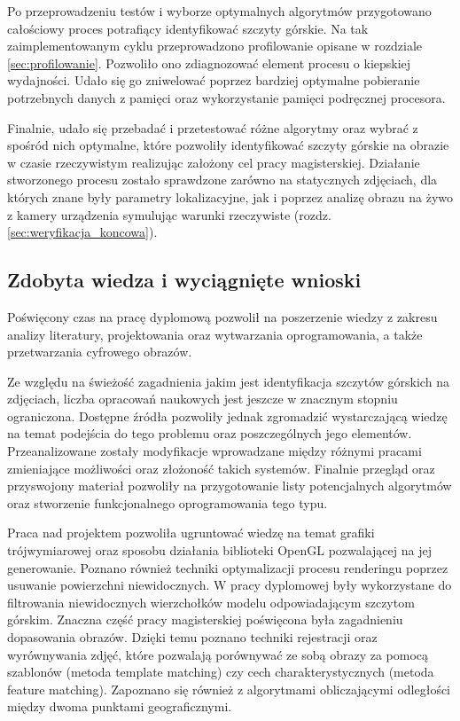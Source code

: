 Po przeprowadzeniu testów i wyborze optymalnych algorytmów przygotowano całościowy proces potrafiący identyfikować szczyty górskie. Na tak zaimplementowanym cyklu przeprowadzono profilowanie opisane w rozdziale \ref{sec:profilowanie}. Pozwoliło ono zdiagnozować element procesu o kiepskiej wydajności. Udało się go zniwelować poprzez bardziej optymalne pobieranie potrzebnych danych z pamięci oraz wykorzystanie pamięci podręcznej procesora.


Finalnie, udało się przebadać i przetestować różne algorytmy oraz wybrać z spośród nich optymalne, które pozwoliły identyfikować szczyty górskie na obrazie w czasie rzeczywistym realizując założony cel pracy magisterskiej. Działanie stworzonego procesu zostało sprawdzone zarówno na statycznych zdjęciach, dla których znane były parametry lokalizacyjne, jak i poprzez analizę obrazu na żywo z kamery urządzenia symulując warunki rzeczywiste (rozdz. \ref{sec:weryfikacja_koncowa}).






\subsection{Zdobyta wiedza i wyciągnięte wnioski}

Poświęcony czas na pracę dyplomową pozwolił na poszerzenie wiedzy z zakresu analizy literatury, projektowania oraz wytwarzania oprogramowania, a także  przetwarzania cyfrowego obrazów. 

Ze względu na świeżość zagadnienia jakim jest identyfikacja szczytów górskich na zdjęciach, liczba opracowań naukowych jest jeszcze w znacznym stopniu ograniczona. Dostępne źródła pozwoliły jednak zgromadzić wystarczającą wiedzę na temat podejścia do tego problemu oraz poszczególnych jego elementów. Przeanalizowane zostały modyfikacje wprowadzane między różnymi pracami zmieniające możliwości oraz złożoność takich systemów. Finalnie przegląd oraz przyswojony materiał pozwoliły na przygotowanie listy potencjalnych algorytmów oraz stworzenie funkcjonalnego oprogramowania tego typu.

Praca nad projektem pozwoliła ugruntować wiedzę na temat grafiki trójwymiarowej oraz sposobu działania biblioteki OpenGL pozwalającej na jej generowanie. Poznano również techniki optymalizacji procesu renderingu poprzez usuwanie powierzchni niewidocznych. W pracy dyplomowej były wykorzystane do filtrowania niewidocznych wierzchołków modelu odpowiadającym szczytom górskim. Znaczna część pracy magisterskiej poświęcona była zagadnieniu dopasowania obrazów. Dzięki temu poznano techniki rejestracji oraz wyrównywania zdjęć, które pozwalają porównywać ze sobą obrazy za pomocą szablonów (metoda template matching) czy cech charakterystycznych (metoda feature matching). Zapoznano się również z algorytmami obliczającymi odległości między dwoma punktami geograficznymi. 


